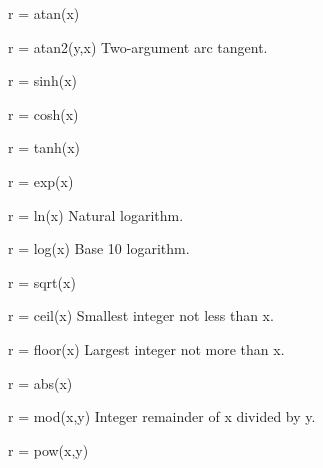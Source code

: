 r = atan(x)

r = atan2(y,x) Two-argument arc tangent.

r = sinh(x)

r = cosh(x)

r = tanh(x)

r = exp(x)

r = ln(x) Natural logarithm.

r = log(x) Base 10 logarithm.

r = sqrt(x)

r = ceil(x) Smallest integer not less than x.

r = floor(x) Largest integer not more than x.

r = abs(x)

r = mod(x,y) Integer remainder of x divided by y.

r = pow(x,y) 
\ttend
